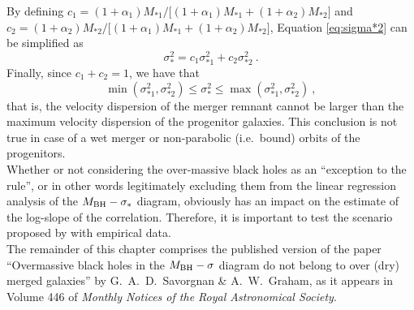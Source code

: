By defining $c_1 = (1+\alpha_1)M_{*1}/\bigl[ (1+\alpha_1)M_{*1} + (1+\alpha_2)M_{*2} \bigr ]$ 
and $c_2 = (1+\alpha_2)M_{*2}/\bigl[ (1+\alpha_1)M_{*1} + (1+\alpha_2)M_{*2} \bigr ]$, 
Equation \ref{eq:sigma*2} can be simplified as 
\begin{equation}
\sigma_*^2 = c_1 \sigma_{*1}^2 + c_2 \sigma_{*2}^2 \ .
\end{equation}
Finally, since $c_1 + c_2 = 1$, we have that 
\begin{equation}
\min(\sigma_{*1}^2, \sigma_{*2}^2) \leq \sigma_*^2 \leq \max(\sigma_{*1}^2, \sigma_{*2}^2) \ ,
\end{equation}
that is, the velocity dispersion of the merger remnant cannot be larger 
than the maximum velocity dispersion of the progenitor galaxies. 
This conclusion is not true in case of a wet merger or non-parabolic (i.e.~bound) orbits of the progenitors. \\

Whether or not considering the over-massive black holes as an ``exception to the rule'', 
or in other words legitimately excluding them from the linear regression analysis of the $M_{\rm BH} - \sigma_*$ diagram, 
obviously has an impact on the estimate of the log-slope of the correlation. 
Therefore, it is important to test the scenario proposed by \citet{volontericiotti2013} 
with empirical data. \\

The remainder of this chapter comprises the published version of the paper 
``Overmassive black holes in the $M_{\rm BH} - \sigma$ diagram 
do not belong to over (dry) merged galaxies'' 
by G.~A.~D.~Savorgnan \& A.~W.~Graham,  
as it appears in Volume 446 of \emph{Monthly Notices of the Royal Astronomical Society}. 



